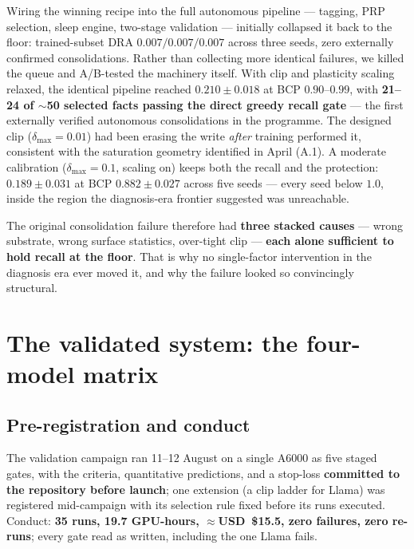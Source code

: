 \documentclass[11pt]{article}
\begin{document}
Wiring the winning recipe into the full autonomous pipeline --- tagging, PRP selection, sleep
engine, two-stage validation --- initially collapsed it back to the floor: trained-subset DRA
$0.007/0.007/0.007$ across three seeds, zero externally confirmed consolidations. Rather than
collecting more identical failures, we killed the queue and A/B-tested the machinery itself. With
clip and plasticity scaling relaxed, the identical pipeline reached
$\mathbf{0.210 \pm 0.018}$ at BCP $0.90$--$0.99$, with \textbf{21--24 of $\sim$50 selected facts
passing the direct greedy recall gate} --- the first externally verified autonomous consolidations
in the programme. The designed clip ($\delta_{\max}=0.01$) had been erasing the write \emph{after}
training performed it, consistent with the saturation geometry identified in April (A.1). A
moderate calibration ($\delta_{\max}=0.1$, scaling on) keeps both the recall and the protection:
$0.189 \pm 0.031$ at BCP $0.882 \pm 0.027$ across five seeds --- every seed below $1.0$, inside
the region the diagnosis-era frontier suggested was unreachable.

The original consolidation failure therefore had \textbf{three stacked causes} --- wrong
substrate, wrong surface statistics, over-tight clip --- \textbf{each alone sufficient to hold
recall at the floor}. That is why no single-factor intervention in the diagnosis era ever moved
it, and why the failure looked so convincingly structural.

\section{The validated system: the four-model matrix}

\subsection{Pre-registration and conduct}

The validation campaign ran 11--12 August on a single A6000 as five staged gates, with the
criteria, quantitative predictions, and a stop-loss \textbf{committed to the repository before
launch}; one extension (a clip ladder for Llama) was registered mid-campaign with its selection
rule fixed before its runs executed. Conduct: \textbf{35 runs, 19.7 GPU-hours, $\approx$USD~\$15.5,
zero failures, zero re-runs}; every gate read as written, including the one Llama fails.
\end{document}
